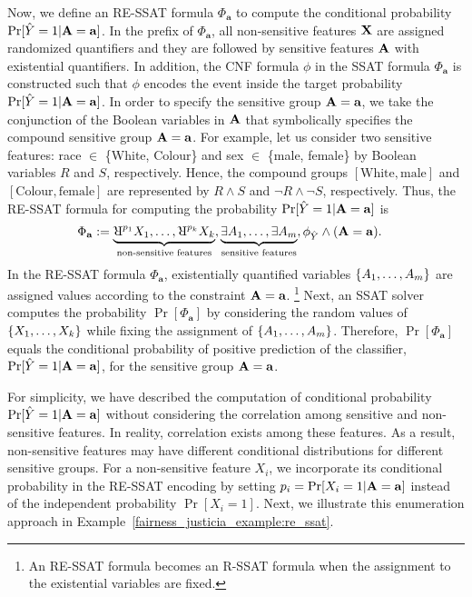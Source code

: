 Now, we define an RE-SSAT formula $\Phi_{\mathbf{a}}$ to compute the conditional probability $\Pr[\hat{Y} = 1 | \mathbf{A} = \mathbf{a}]$. In the prefix of $ \Phi_{\mathbf{a}} $,  all non-sensitive features $ \mathbf{X} $ are assigned randomized quantifiers and they are followed by sensitive features $ \mathbf{A} $ with existential quantifiers.  In addition, the CNF formula $ \phi $ in the SSAT formula $ \Phi_{\mathbf{a}} $ is constructed such that $ \phi $ encodes the event inside the target probability $ \Pr[\hat{Y} = 1 | \mathbf{A} = \mathbf{a}] $. In order to specify the sensitive group $ \mathbf{A} = \mathbf{a} $, we take the conjunction of the Boolean variables in $ \mathbf{A} $ that symbolically specifies the compound sensitive group $ \mathbf{A} = \mathbf{a} $. For example, let us consider two sensitive features: race $ \in $ \{White, Colour\} and sex $ \in $ \{male, female\} by Boolean variables $ R $ and $ S $,  respectively. Hence, the compound groups $ [\textrm{White}, \textrm{male}] $ and $[\textrm{Colour}, \textrm{female}]$ are represented by $ R \wedge S $ and $ \neg R \wedge \neg S $, respectively. Thus, the RE-SSAT formula for computing the probability  $ \Pr[\hat{Y} = 1 | \mathbf{A} = \mathbf{a}] $ is
\begin{equation}	\label{fairness_justicia_eq:re}
\begin{split}
	\Phi_{\mathbf{a}} := \underbrace{\R^{p_{1}}X_1, \dots, \R^{p_{\numnonsensitive}}X_{\numnonsensitive}}_{\text{non-sensitive features}},  &\underbrace{\exists A_1,\dots, \exists A_{\numsensitive}}_{\text{sensitive features}},
\phi_{\hat{Y}} \wedge (\sensitive =\mathbf{a}).\notag
\end{split}
\end{equation}
In the RE-SSAT formula $ \Phi_{\mathbf{a}} $, existentially quantified variables  $ \{A_1, \dots, A_{m}\} $ are assigned values  according  to the constraint $ \mathbf{A} =\mathbf{a} $. \footnote{An RE-SSAT formula becomes an R-SSAT formula when the assignment to the existential variables are fixed.} Next,  an SSAT solver computes the probability $ \Pr[\Phi_{\mathbf{a}}] $ by considering the random values of $ \{X_1, \dots, X_{k}\} $ while fixing the assignment of $ \{A_1, \dots, A_{m}\} $. Therefore, $ \Pr[\Phi_{\mathbf{a}}] $ equals the conditional probability of positive prediction of the classifier, $ \Pr[\hat{Y} = 1 | \mathbf{A} = \mathbf{a}] $, for the sensitive group $ \mathbf{A} = \mathbf{a} $. 

For simplicity, we have described the computation of conditional probability $ \Pr[\hat{Y} = 1 | \mathbf{A} = \mathbf{a}] $ without considering the correlation among sensitive and non-sensitive features. In reality, correlation exists among these features. As a result, non-sensitive features may have different conditional distributions for different sensitive groups. For a non-sensitive feature $ X_i $, we incorporate its conditional probability in the RE-SSAT encoding by setting $ p_i = \Pr[X_i = 1| \mathbf{A} =\mathbf{a}] $ instead of the independent probability $\Pr[X_i = 1]$. Next, we illustrate this enumeration approach in Example~\ref{fairness_justicia_example:re_ssat}.

